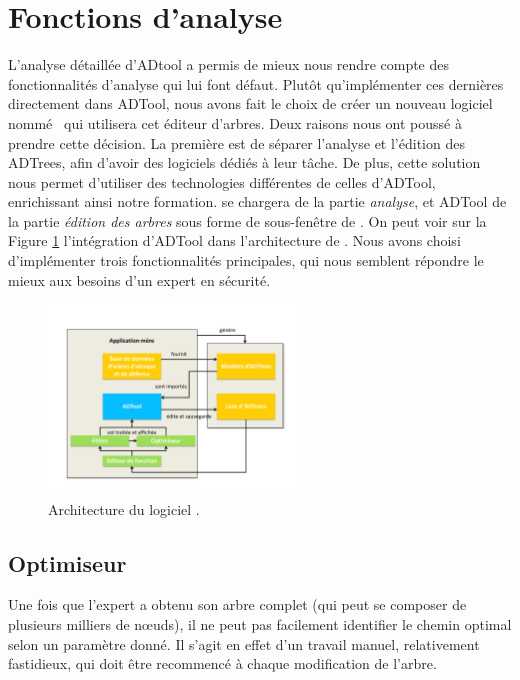 \section{Fonctions d'analyse}

	L'analyse détaillée d'ADtool a permis de mieux nous rendre compte des fonctionnalités d'analyse qui lui font défaut. Plutôt qu'implémenter ces dernières directement dans ADTool, nous avons fait le choix de créer un nouveau logiciel nommé \glasir\ qui utilisera cet éditeur d'arbres. Deux raisons nous ont poussé à prendre cette décision. La première est de séparer l'analyse et l'édition des ADTrees, afin d'avoir des logiciels dédiés à leur tâche. De plus, cette solution nous permet d'utiliser des technologies différentes de celles d'ADTool, enrichissant ainsi notre formation.  \glasir{} se chargera de la partie \textit{analyse}, et ADTool de la partie \textit{édition des arbres} sous forme de sous-fenêtre de \glasir{}. On peut voir sur la {\sc Figure} \ref{fig:architecture_Glasir} l'intégration d'ADTool dans l'architecture de \glasir{}. Nous avons choisi d'implémenter trois fonctionnalités principales, qui nous semblent répondre le mieux aux besoins d'un expert en sécurité.

		\begin{figure}[h!]
			\centering
				\includegraphics[width=0.6\textwidth]{figure/archiGlasir.pdf}
			\caption{Architecture du logiciel \glasir.}
			\label{fig:architecture_Glasir}
		\end{figure}

		\subsection{Optimiseur}
		\label{subsection:optimiseur}
		Une fois que l'expert a obtenu son arbre complet (qui peut se composer de plusieurs milliers de nœuds), il ne peut pas facilement identifier le chemin optimal selon un paramètre donné. Il s'agit en effet d'un travail manuel, relativement fastidieux, qui doit être recommencé à chaque modification de l'arbre.
		
